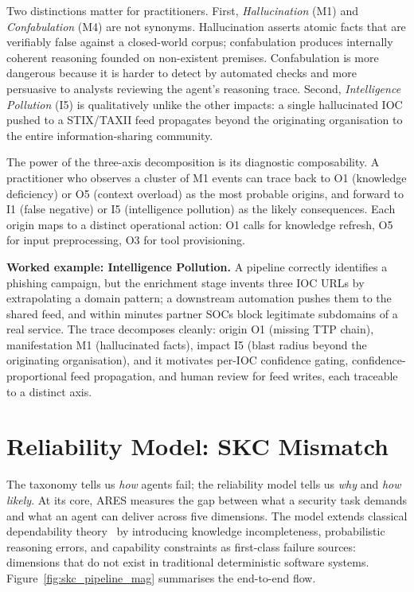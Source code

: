 \documentclass[journal,compsoc]{IEEEtran}
\newcommand{\ARES}{\textsc{ARES}}
\begin{document}
Two distinctions matter for practitioners. First, \textit{Hallucination}
(M1) and \textit{Confabulation} (M4) are not synonyms. Hallucination
asserts atomic facts that are verifiably false against a closed-world
corpus; confabulation produces internally coherent reasoning founded
on non-existent premises. Confabulation is more dangerous because it
is harder to detect by automated checks and more persuasive to
analysts reviewing the agent's reasoning trace. Second,
\textit{Intelligence Pollution} (I5) is qualitatively unlike the other
impacts: a single hallucinated IOC pushed to a STIX/TAXII feed
propagates beyond the originating organisation to the entire
information-sharing community.

The power of the three-axis decomposition is its diagnostic
composability. A practitioner who observes a cluster of M1 events can
trace back to O1 (knowledge deficiency) or O5 (context overload) as
the most probable origins, and forward to I1 (false negative) or I5
(intelligence pollution) as the likely consequences. Each origin maps
to a distinct operational action: O1 calls for knowledge refresh, O5
for input preprocessing, O3 for tool provisioning.

\textbf{Worked example: Intelligence Pollution.}
A pipeline correctly identifies a phishing campaign, but the enrichment
stage invents three IOC URLs by extrapolating a domain pattern; a
downstream automation pushes them to the shared feed, and within minutes
partner SOCs block legitimate subdomains of a real service. The trace
decomposes cleanly: origin O1 (missing TTP chain), manifestation M1
(hallucinated facts), impact I5 (blast radius beyond the originating
organisation), and it motivates per-IOC confidence gating,
confidence-proportional feed propagation, and human review for feed
writes, each traceable to a distinct axis.

\section{Reliability Model: SKC Mismatch}

The taxonomy tells us \textit{how} agents fail; the reliability model tells
us \textit{why} and \textit{how likely}. At its core, \ARES{} measures the
gap between what a security task demands and what an agent can deliver across
five dimensions. The model extends classical dependability
theory~\cite{avizienis2004} by introducing knowledge incompleteness,
probabilistic reasoning errors, and capability constraints as first-class
failure sources: dimensions that do not exist in traditional deterministic
software systems.
Figure~\ref{fig:skc_pipeline_mag} summarises the end-to-end flow.
\end{document}
